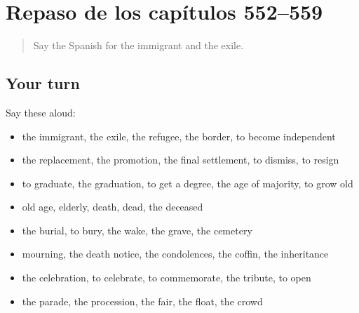 \section[(dialogue)]{Repaso de los capítulos 552–559}

\label{lesson:ES-R559-repaso-552-559}



\begin{quote}
Say the Spanish for the immigrant and the exile.
\end{quote}

\subsection*{Your turn}
Say these aloud:

\begin{itemize}
\raggedright
  \item the immigrant, the exile, the refugee, the border, to become independent
  \item the replacement, the promotion, the final settlement, to dismiss, to resign
  \item to graduate, the graduation, to get a degree, the age of majority, to grow old
  \item old age, elderly, death, dead, the deceased
  \item the burial, to bury, the wake, the grave, the cemetery
  \item mourning, the death notice, the condolences, the coffin, the inheritance
  \item the celebration, to celebrate, to commemorate, the tribute, to open
  \item the parade, the procession, the fair, the float, the crowd
\end{itemize}

